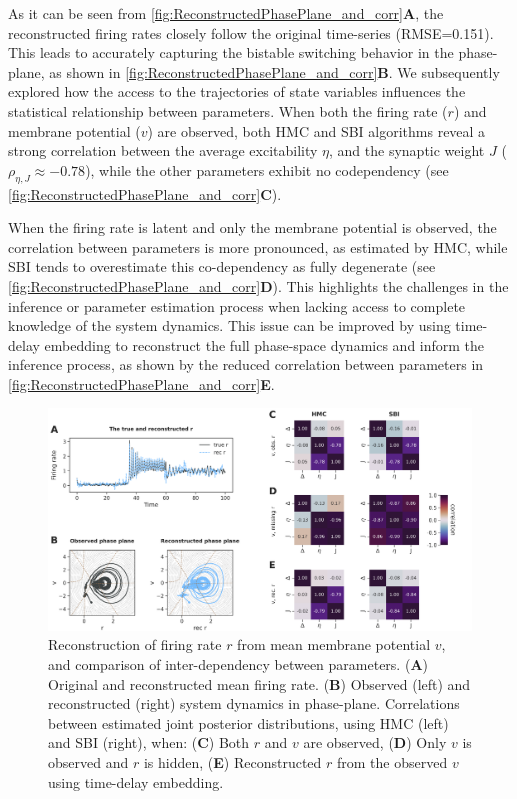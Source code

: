 \documentclass[preprint,11pt,authoryear]{elsarticle}
\begin{document}
As it can be seen from \autoref{fig:ReconstructedPhasePlane_and_corr}\textbf{A}, the reconstructed firing rates closely follow the original time-series (RMSE=0.151). This leads to accurately capturing the bistable switching behavior in the phase-plane, as shown in \autoref{fig:ReconstructedPhasePlane_and_corr}\textbf{B}. We subsequently explored how the access to the trajectories of state variables influences the statistical relationship between parameters. When both the firing rate ($r$) and membrane potential ($v$) are observed, both HMC and SBI algorithms reveal a strong correlation between the average excitability $\eta$, and the synaptic weight $J$ ($\rho_{\eta, J} \approx -0.78$), while the other parameters exhibit no codependency (see \autoref{fig:ReconstructedPhasePlane_and_corr}\textbf{C}). 

When the firing rate is latent and only the membrane potential is observed, the correlation between parameters is more pronounced, as estimated by HMC, while SBI tends to overestimate this co-dependency as fully degenerate (see \autoref{fig:ReconstructedPhasePlane_and_corr}\textbf{D}). This highlights the challenges in the inference or parameter estimation process when lacking access to complete knowledge of the system dynamics. This issue can be improved by using time-delay embedding to reconstruct the full phase-space dynamics and inform the inference process, as shown by the reduced correlation between parameters in  \autoref{fig:ReconstructedPhasePlane_and_corr}\textbf{E}. 


\begin{figure}
    \centering
    \includegraphics[width=\linewidth]{Figs/Fig5.png}
    \caption{Reconstruction of firing rate $r$ from mean membrane potential $v$, and comparison of inter-dependency between parameters. (\textbf{A}) Original and reconstructed mean firing rate. (\textbf{B}) Observed (left) and reconstructed (right) system dynamics in phase-plane. Correlations between estimated joint posterior distributions, using HMC (left) and SBI (right), when: (\textbf{C}) Both $r$ and $v$ are observed, (\textbf{D}) Only $v$ is observed and $r$ is hidden, (\textbf{E}) Reconstructed $r$ from the observed $v$ using time-delay embedding. }
    \label{fig:ReconstructedPhasePlane_and_corr}
\end{figure}
\end{document}
